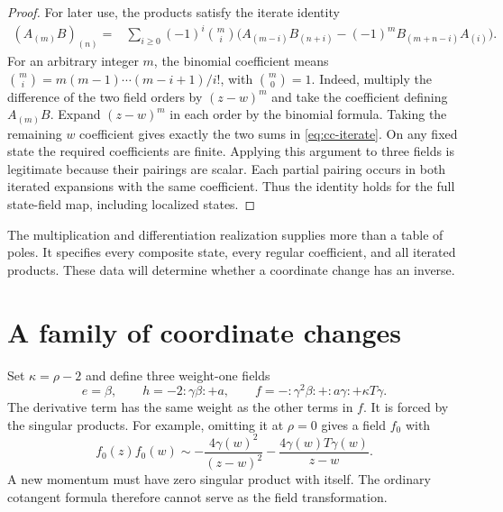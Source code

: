 \begin{proof}
For later use, the products satisfy the iterate identity
\begin{align}
 (A_{(m)}B)_{(n)}={}&\sum_{i\geq0}(-1)^i\binom mi
 \bigl(A_{(m-i)}B_{(n+i)}
       -(-1)^m B_{(m+n-i)}A_{(i)}\bigr).
 \label{eq:cc-iterate}
\end{align}
For an arbitrary integer $m$, the binomial coefficient means
$\binom mi=m(m-1)\cdots(m-i+1)/i!$, with $\binom m0=1$.
Indeed, multiply the difference of the two field orders by $(z-w)^m$ and take the coefficient defining $A_{(m)}B$.
Expand $(z-w)^m$ in each order by the binomial formula.
Taking the remaining $w$ coefficient gives exactly the two sums in \eqref{eq:cc-iterate}.
On any fixed state the required coefficients are finite.
Applying this argument to three fields is legitimate because their pairings are scalar.
Each partial pairing occurs in both iterated expansions with the same coefficient.
Thus the identity holds for the full state-field map, including localized states.
\end{proof}

The multiplication and differentiation realization supplies more than a table of poles.
It specifies every composite state, every regular coefficient, and all iterated products.
These data will determine whether a coordinate change has an inverse.

\section{A family of coordinate changes}

Set $\kappa=\rho-2$ and define three weight-one fields
\begin{equation}\label{eq:cc-currents}
 e=\beta,\qquad h=-2:\gamma\beta:+a,\qquad
 f=-:\gamma^2\beta:+:a\gamma:+\kappa T\gamma.
\end{equation}
The derivative term has the same weight as the other terms in $f$.
It is forced by the singular products.
For example, omitting it at $\rho=0$ gives a field $f_0$ with
\[
 f_0(z)f_0(w)\sim
 -\frac{4\gamma(w)^2}{(z-w)^2}
 -\frac{4\gamma(w)T\gamma(w)}{z-w}.
\]
A new momentum must have zero singular product with itself.
The ordinary cotangent formula therefore cannot serve as the field transformation.

